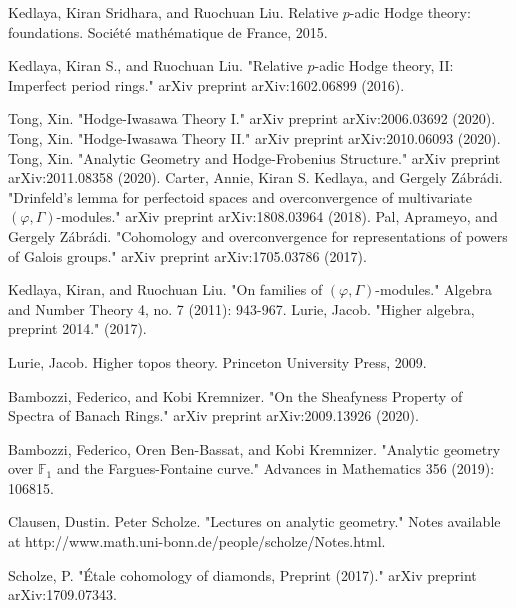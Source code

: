 \documentclass[12pt]{amsart}
\theoremstyle{definition}
\numberwithin{equation}{section}
\begin{document}
\newpage



\begin{thebibliography}{10}
 Kedlaya, Kiran Sridhara, and Ruochuan Liu. Relative $p$-adic Hodge theory: foundations. Soci\'et\'e math\'ematique de France, 2015.

 Kedlaya, Kiran S., and Ruochuan Liu. "Relative $p$-adic Hodge theory, II: Imperfect period rings." arXiv preprint arXiv:1602.06899 (2016).

 Tong, Xin. "Hodge-Iwasawa Theory I." arXiv preprint arXiv:2006.03692 (2020).
 Tong, Xin. "Hodge-Iwasawa Theory II." arXiv preprint arXiv:2010.06093 (2020).
 Tong, Xin. "Analytic Geometry and Hodge-Frobenius Structure." arXiv preprint arXiv:2011.08358 (2020).
 Carter, Annie, Kiran S. Kedlaya, and Gergely Z\'abr\'adi. "Drinfeld's lemma for perfectoid spaces and overconvergence of multivariate $(\varphi,\Gamma) $-modules." arXiv preprint arXiv:1808.03964 (2018).
 Pal, Aprameyo, and Gergely Z\'abr\'adi. "Cohomology and overconvergence for representations of powers of Galois groups." arXiv preprint arXiv:1705.03786 (2017).


 Kedlaya, Kiran, and Ruochuan Liu. "On families of $(\varphi, \Gamma)$-modules." Algebra and Number Theory 4, no. 7 (2011): 943-967.
 Lurie, Jacob. "Higher algebra, preprint 2014." (2017).

 Lurie, Jacob. Higher topos theory. Princeton University Press, 2009.


 Bambozzi, Federico, and Kobi Kremnizer. "On the Sheafyness Property of Spectra of Banach Rings." arXiv preprint arXiv:2009.13926 (2020).


 Bambozzi, Federico, Oren Ben-Bassat, and Kobi Kremnizer. "Analytic geometry over $\mathbb{F}_1$ and the Fargues-Fontaine curve." Advances in Mathematics 356 (2019): 106815.


 Clausen, Dustin. Peter Scholze. "Lectures on analytic geometry." Notes available at http://www.math.uni-bonn.de/people/scholze/Notes.html. 


 Scholze, P. "\'Etale cohomology of diamonds, Preprint (2017)." arXiv preprint arXiv:1709.07343.



\end{thebibliography}



%
\end{document}
